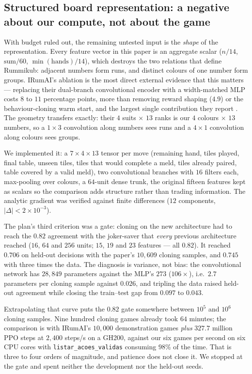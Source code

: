 \documentclass[11pt]{article}
\begin{document}
\subsection{Structured board representation: a negative about our compute, not about the game}\label{sec:conv}
With budget ruled out, the remaining untested input is the \emph{shape} of the representation. Every feature vector in this paper is an aggregate scalar ($n/14$, $\text{sum}/60$, $\min(\text{hands})/14$), which destroys the two relations that define Rummikub: adjacent numbers form runs, and distinct colours of one number form groups. IRumAI's ablation is the most direct external evidence that this matters --- replacing their dual-branch convolutional encoder with a width-matched MLP costs $8$ to $11$ percentage points, more than removing reward shaping ($4.9$) or the behaviour-cloning warm start, and the largest single contribution they report \cite{mohan2026}. The geometry transfers exactly: their $4$ suits $\times$ $13$ ranks is our $4$ colours $\times$ $13$ numbers, so a $1\times3$ convolution along numbers sees runs and a $4\times1$ convolution along colours sees groups.

We implemented it: a $7\times4\times13$ tensor per move (remaining hand, tiles played, final table, unseen tiles, tiles that would complete a meld, tiles already paired, table covered by a valid meld), two convolutional branches with $16$ filters each, max-pooling over colours, a $64$-unit dense trunk, the original fifteen features kept as scalars so the comparison adds structure rather than trading information. The analytic gradient was verified against finite differences ($12$ components, $|\Delta|<2\times10^{-3}$).

The plan's third criterion was a gate: cloning on the new architecture had to reach the $0.82$ agreement with the joker-saver that \emph{every} previous architecture reached ($16$, $64$ and $256$ units; $15$, $19$ and $23$ features --- all $0.82$). It reached $0.706$ on held-out decisions with the paper's $10{,}609$ cloning samples, and $0.745$ with three times the data. The diagnosis is variance, not bias: the convolutional network has $28{,}849$ parameters against the MLP's $273$ ($106\times$), i.e.\ $2.7$ parameters per cloning sample against $0.026$, and tripling the data raised held-out agreement while closing the train--test gap from $0.097$ to $0.043$.

Extrapolating that curve puts the $0.82$ gate somewhere between $10^5$ and $10^6$ cloning samples. Nine hundred cloning games already took $64$ minutes; the comparison is with IRumAI's $10{,}000$ demonstration games \emph{plus} $327.7$ million PPO steps at $2{,}400$ steps/s on a GH200, against our six games per second on six CPU cores with \texttt{listar\_acoes\_validas} consuming $98\%$ of the time. That is three to four orders of magnitude, and patience does not close it. We stopped at the gate and spent neither the development nor the held-out seeds.
\end{document}
